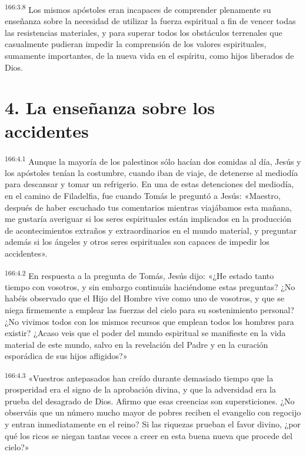 \par
\textsuperscript{166:3.8} Los mismos apóstoles eran incapaces de comprender plenamente su enseñanza sobre la necesidad de utilizar la fuerza espiritual a fin de vencer todas las resistencias materiales, y para superar todos los obstáculos terrenales que casualmente pudieran impedir la comprensión de los valores espirituales, sumamente importantes, de la nueva vida en el espíritu, como hijos liberados de Dios.

\section*{4. La enseñanza sobre los accidentes}
\par
\textsuperscript{166:4.1} Aunque la mayoría de los palestinos sólo hacían dos comidas al día, Jesús y los apóstoles tenían la costumbre, cuando iban de viaje, de detenerse al mediodía para descansar y tomar un refrigerio. En una de estas detenciones del mediodía, en el camino de Filadelfia, fue cuando Tomás le preguntó a Jesús: «Maestro, después de haber escuchado tus comentarios mientras viajábamos esta mañana, me gustaría averiguar si los seres espirituales están implicados en la producción de acontecimientos extraños y extraordinarios en el mundo material, y preguntar además si los ángeles y otros seres espirituales son capaces de impedir los accidentes».

\par
\textsuperscript{166:4.2} En respuesta a la pregunta de Tomás, Jesús dijo: «¿He estado tanto tiempo con vosotros, y sin embargo continuáis haciéndome estas preguntas? ¿No habéis observado que el Hijo del Hombre vive como uno de vosotros, y que se niega firmemente a emplear las fuerzas del cielo para su sostenimiento personal? ¿No vivimos todos con los mismos recursos que emplean todos los hombres para existir? ¿Acaso veis que el poder del mundo espiritual se manifieste en la vida material de este mundo, salvo en la revelación del Padre y en la curación esporádica de sus hijos afligidos?»

\par
\textsuperscript{166:4.3} «Vuestros antepasados han creído durante demasiado tiempo que la prosperidad era el signo de la aprobación divina, y que la adversidad era la prueba del desagrado de Dios. Afirmo que esas creencias son supersticiones. ¿No observáis que un número mucho mayor de pobres reciben el evangelio con regocijo y entran inmediatamente en el reino? Si las riquezas prueban el favor divino, ¿por qué los ricos se niegan tantas veces a creer en esta buena nueva que procede del cielo?»

